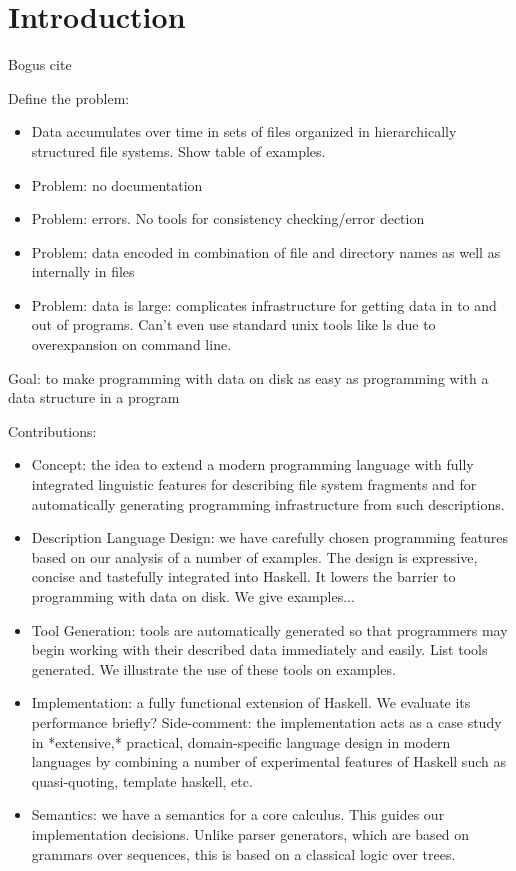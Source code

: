 \section {Introduction}
\label{sec:intro}

Bogus cite~\cite{fisher+:pads}

Define the problem:

\begin{itemize}
\item Data accumulates over time in sets of files organized in
hierarchically structured file systems.  Show table of examples.
\item Problem: no documentation
\item Problem: errors. No tools for consistency checking/error dection
\item Problem: data encoded in combination of file and directory names as
well as internally in files
\item Problem: data is large: complicates infrastructure for getting
  data in to and out of programs. Can't even use standard unix tools
  like ls due to overexpansion on command line.
\end{itemize}

Goal: to make programming with data on disk as easy as programming
with a data structure in a program

Contributions:

\begin{itemize}
\item Concept:  the idea to extend a modern programming language with
fully integrated linguistic features for describing file system fragments
and for automatically generating programming infrastructure from such 
descriptions.

\item Description Language Design: we have carefully chosen \forest{}
  programming features based on our analysis of a number of examples.
  The design is expressive, concise and tastefully integrated into
  Haskell.  It lowers the barrier to programming with data on disk.
  We give examples...

\item Tool Generation: tools are automatically generated so that
  programmers may begin working with their described data immediately
  and easily.  List tools generated.  We illustrate the use of these
  tools on examples.

\item Implementation: a fully functional extension of Haskell.  We
  evaluate its performance briefly?  Side-comment: the implementation
  acts as a case study in *extensive,* practical, domain-specific
  language design in modern languages by combining a number of
  experimental features of Haskell such as quasi-quoting, template
  haskell, etc.

\item Semantics: we have a semantics for a core calculus.  This guides
  our implementation decisions.  Unlike parser generators, which are
  based on grammars over sequences, this is based on a classical logic
  over trees.
\end{itemize}


